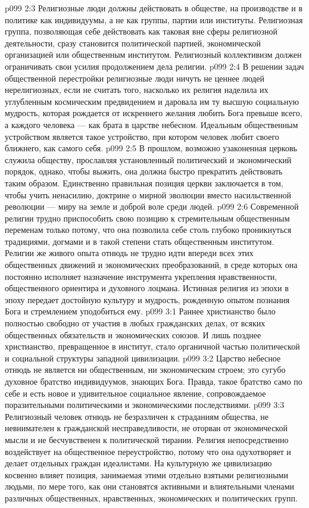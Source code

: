 \vs p099 2:3 \pc Религиозные люди должны действовать в обществе, на производстве и в политике как индивидуумы, а не как группы, партии или институты. Религиозная группа, позволяющая себе действовать как таковая вне сферы религиозной деятельности, сразу становится политической партией, экономической организацией или общественным институтом. Религиозный коллективизм должен ограничивать свои усилия продолжением дела религии.
\vs p099 2:4 В решении задач общественной перестройки религиозные люди ничуть не ценнее людей нерелигиозных, если не считать того, насколько их религия наделила их углубленным космическим предвидением и даровала им ту высшую социальную мудрость, которая рождается от искреннего желания любить Бога превыше всего, а каждого человека --- как брата в царстве небесном. Идеальным общественным устройством является такое устройство, при котором человек любит своего ближнего, как самого себя.
\vs p099 2:5 \pc В прошлом, возможно узаконенная церковь служила обществу, прославляя установленный политический и экономический порядок, однако, чтобы выжить, она должна быстро прекратить действовать таким образом. Единственно правильная позиция церкви заключается в том, чтобы учить ненасилию, доктрине о мирной эволюции вместо насильственной революции --- миру на земле и доброй воле среди людей.
\vs p099 2:6 Современной религии трудно приспособить свою позицию к стремительным общественным переменам только потому, что она позволила себе столь глубоко проникнуться традициями, догмами и в такой степени стать общественным институтом. Религии же живого опыта отнюдь не трудно идти впереди всех этих общественных движений и экономических преобразований, в среде которых она постоянно исполняет назначение инструмента укрепления нравственности, общественного ориентира и духовного лоцмана. Истинная религия из эпохи в эпоху передает достойную культуру и мудрость, рожденную опытом познания Бога и стремлением уподобиться ему.
\vs p099 3:1 Раннее христианство было полностью свободно от участия в любых гражданских делах, от всяких общественных обязательств и экономических союзов. И лишь позднее христианство, превращенное в институт, стало органичной частью политической и социальной структуры западной цивилизации.
\vs p099 3:2 \pc Царство небесное отнюдь не является ни общественным, ни экономическим строем; это сугубо духовное братство индивидуумов, знающих Бога. Правда, такое братство само по себе и есть новое и удивительное социальное явление, сопровождаемое поразительными политическими и экономическими последствиями.
\vs p099 3:3 Религиозный человек отнюдь не безразличен к страданиям общества, не невнимателен к гражданской несправедливости, не оторван от экономической мысли и не бесчувственен к политической тирании. Религия непосредственно воздействует на общественное переустройство, потому что она одухотворяет и делает отдельных граждан идеалистами. На культурную же цивилизацию косвенно влияет позиция, занимаемая этими отдельно взятыми религиозными людьми, по мере того, как они становятся активными и влиятельными членами различных общественных, нравственных, экономических и политических групп.
